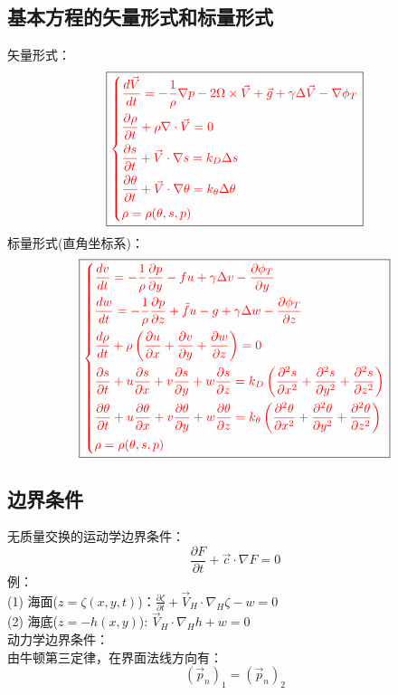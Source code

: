 \documentclass[a4paper,12pt]{article}
\begin{document}
    \subsection{基本方程的矢量形式和标量形式}
    矢量形式：
    \[
        \boxed{
        \color{red}
        \left\{
        \begin{aligned}
            &\frac{d \vec{V}}{d t}=-\frac{1}{\rho} \nabla p-2 \Omega \times \vec{V}+\vec{g}+\gamma \Delta \vec{V}-\nabla \phi_{T}\\
            &\frac{\partial \rho}{\partial t}+\rho \nabla \cdot \vec{V}=0\\
            &\frac{\partial s}{\partial t}+\vec{V} \cdot \nabla s=k_{D} \Delta s\\
            &\frac{\partial \theta}{\partial t}+\vec{V} \cdot \nabla \theta={k}_{\theta} \Delta \theta\\
            &\rho=\rho(\theta, s, p)
        \end{aligned}
        \right.
        }
    \]
    标量形式(直角坐标系)：
    \[
        \boxed{
        \color{red}
        \left\{
        \begin{aligned}
            &\frac{d v}{d t}=-\frac{1}{\rho} \frac{\partial p}{\partial y}-f u+\gamma \Delta v-\frac{\partial \phi_{T}}{\partial y}\\
            &\frac{d w}{d t}=-\frac{1}{\rho} \frac{\partial p}{\partial z}+\tilde{f} u-g+\gamma \Delta w-\frac{\partial \phi_{T}}{\partial z}\\
            &\frac{d \rho}{d t}+\rho\left(\frac{\partial {u}}{\partial {x}}+\frac{\partial {v}}{\partial {y}}+\frac{\partial {w}}{\partial {z}}\right)=0\\
            &\frac{\partial s}{\partial t}+u \frac{\partial s}{\partial x}+v \frac{\partial s}{\partial y}+w \frac{\partial s}{\partial z}=k_{D}\left(\frac{\partial^{2} s}{\partial x^{2}}+\frac{\partial^{2} s}{\partial y^{2}}+\frac{\partial^{2} s}{\partial z^{2}}\right)\\
            &\frac{\partial \theta}{\partial t}+u \frac{\partial \theta}{\partial x}+v \frac{\partial \theta}{\partial y}+w \frac{\partial \theta}{\partial z}=k_{\theta}\left(\frac{\partial^{2} \theta}{\partial x^{2}}+\frac{\partial^{2} \theta}{\partial y^{2}}+\frac{\partial^{2} \theta}{\partial z^{2}}\right)\\
            &\rho=\rho(\theta, s, p)
        \end{aligned}
        \right.
        }
    \]
    \subsection{边界条件}
    无质量交换的运动学边界条件：
    \[
        \frac{\partial F}{\partial t} + \vec{c} \cdot \nabla F=0
    \]
    例：\\
    (1) 海面($z=\displaystyle \zeta (x,y,t)$)：$\displaystyle \frac{\partial \zeta}{\partial t}+\vec{V}_{H} \cdot \nabla_{H} \zeta-w=0$\\
    (2) 海底($\displaystyle z=-h(x,y)$): $\displaystyle \vec{V}_{H} \cdot \nabla_{H} h+w=0$\\
    动力学边界条件：\\
    由牛顿第三定律，在界面法线方向有：
    \[
        \left(\vec{p}_{n}\right)_{1}=\left(\vec{p}_{n}\right)_{2}
    \]
\end{document}
